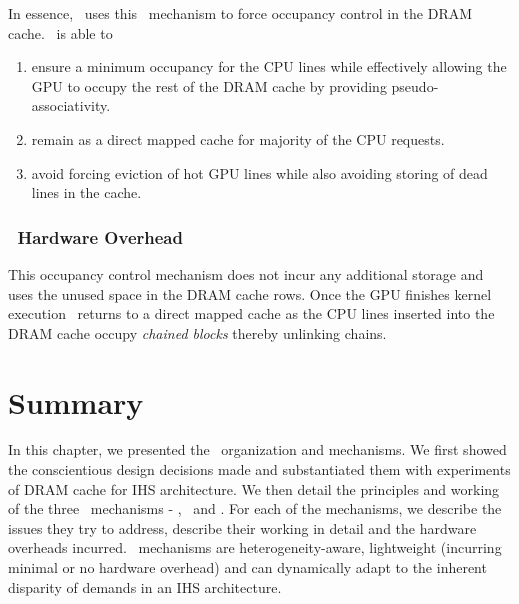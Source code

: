 \par In essence, \cachename\ uses this \chaining\ mechanism to force occupancy control in the DRAM cache. \chaining\ is able to 
\begin{enumerate}[label=(\roman*)]
	\item ensure a minimum occupancy for the CPU lines while effectively allowing the GPU to occupy the rest of the DRAM cache by providing pseudo-associativity.
	\item remain as a direct mapped cache for majority of the CPU requests.
	\item avoid forcing eviction of hot GPU lines while also avoiding storing of dead lines in the cache.
\end{enumerate}

\subsubsection{\chaining\ Hardware Overhead}
This occupancy control mechanism does not incur any additional storage and uses the unused space in the DRAM cache rows. Once the GPU finishes kernel execution \cachename\ returns to a direct mapped cache as the CPU lines inserted into the DRAM cache occupy \textit{chained blocks} thereby unlinking chains. 

\section{Summary}
In this chapter, we presented the \cachename\ organization and mechanisms. We first showed the conscientious design decisions made and substantiated them with experiments of DRAM cache for IHS architecture. We then detail the principles and working of the three \cachename\ mechanisms - \prioname, \bypassname\ and \chaining. For each of the mechanisms, we describe the issues they try to address, describe their working in detail and the hardware overheads incurred. \cachename\ mechanisms are heterogeneity-aware, lightweight (incurring minimal or no hardware overhead) and can dynamically adapt to the inherent disparity of demands in an IHS architecture.

